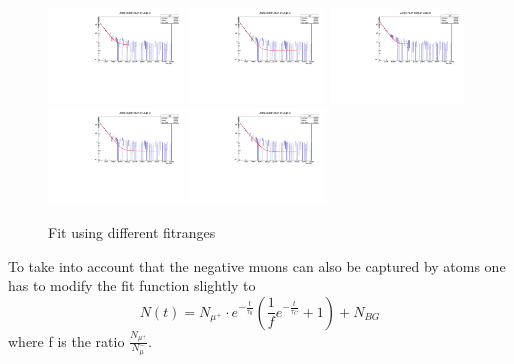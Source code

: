 \begin{figure}[H]
    \centering
    \includegraphics[width=0.32\textwidth]{figures/Fit1_1000_20000.pdf}
    \includegraphics[width=0.32\textwidth]{figures/Fit2_300_40000.pdf}
    \includegraphics[width=0.32\textwidth]{figures/Fit3_300_20000.pdf}
    \includegraphics[width=0.32\textwidth]{figures/Fit4_1000_40000.pdf}
    \includegraphics[width=0.32\textwidth]{figures/Fit5_2000_40000.pdf}
    \caption{Fit using different fitranges}
    \label{f:fitrange}
\end{figure}

To take into account that the negative muons can also be captured by atoms one has to modify the fit function slightly to
\begin{equation} \label{eq:fit2}
	N(t)=N_{\mu^+}\cdot e^{-\frac{t}{\tau_0}}\left(\frac{1}{f}e^{-\frac{t}{\tau_C}}+1\right)+N_{BG}
\end{equation}
where f is the ratio $\frac{N_{\mu^+}}{N_\mu^-}$. 

